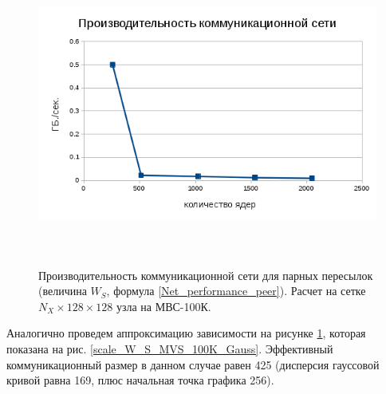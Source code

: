 \begin{figure}[h]
	
	
	\begin{center}
		\includegraphics[height=10cm,keepaspectratio]{images/W_S_MVS_100K_on_weak_eff.png}
		\caption{
			Производительность коммуникационной сети для парных пересылок (величина $W_S$, формула \ref{Net_performance_peer}). Расчет на сетке $N_X \times 128 \times 128$ узла на МВС-100К. 
		}
		\label{scale_W_S_MVS_100K}
	\end{center} 
\end{figure}

Аналогично проведем аппроксимацию зависимости на рисунке \ref{scale_W_S_MVS_100K}, которая показана на рис. \ref{scale_W_S_MVS_100K_Gauss}. Эффективный коммуникационный размер в данном случае равен 425 (дисперсия гауссовой кривой равна 169, плюс начальная точка графика 256).

